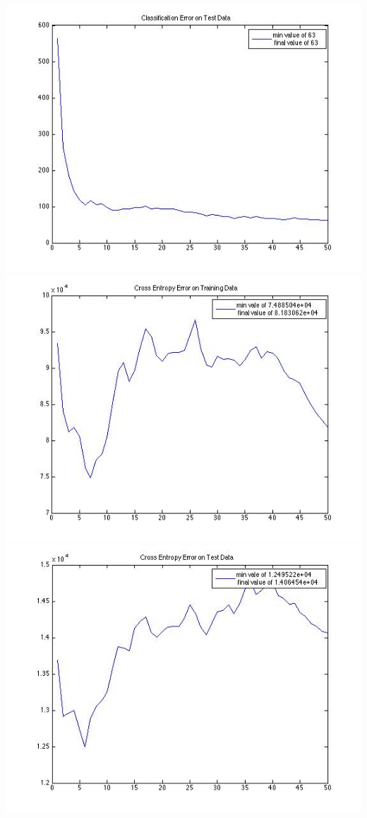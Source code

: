 \documentclass{article}
\begin{document}
\includegraphics[scale=0.4]{rbm_h400_l0.005_m0.8/classErrTest.jpg}\\
\includegraphics[scale=0.4]{rbm_h400_l0.005_m0.8/crossEntroTrain.jpg}
\includegraphics[scale=0.4]{rbm_h400_l0.005_m0.8/crossEntroTest.jpg}\\
\end{document}
